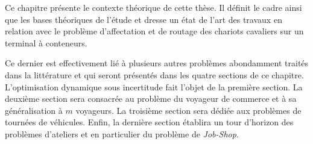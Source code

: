 Ce chapitre présente le contexte théorique de cette thèse. Il définit le cadre ainsi que les bases théoriques de l'étude et dresse un état de l'art des travaux en relation avec le problème d'affectation et de routage des chariots cavaliers sur un terminal à conteneurs. 

Ce dernier est effectivement lié à plusieurs autres problèmes abondamment traités dans la littérature et qui seront présentés dans les quatre sections de ce chapitre. L'optimisation dynamique sous incertitude fait l'objet de la première section. La deuxième section sera consacrée au problème du voyageur de commerce et à sa généralisation à $m$ voyageurs. La troisième section sera dédiée aux problèmes de tournées de véhicules. Enfin, la dernière section établira un tour d'horizon des problèmes d'ateliers et en particulier du problème de \textit{Job-Shop}.